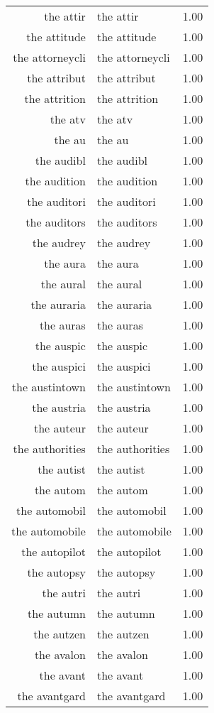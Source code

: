 \begin{table}[ht]
\begin{tabular}{rlr}
  the attir & the attir & 1.00 \\ 
  the attitude & the attitude & 1.00 \\ 
  the attorneycli & the attorneycli & 1.00 \\ 
  the attribut & the attribut & 1.00 \\ 
  the attrition & the attrition & 1.00 \\ 
  the atv & the atv & 1.00 \\ 
  the au & the au & 1.00 \\ 
  the audibl & the audibl & 1.00 \\ 
  the audition & the audition & 1.00 \\ 
  the auditori & the auditori & 1.00 \\ 
  the auditors & the auditors & 1.00 \\ 
  the audrey & the audrey & 1.00 \\ 
  the aura & the aura & 1.00 \\ 
  the aural & the aural & 1.00 \\ 
  the auraria & the auraria & 1.00 \\ 
  the auras & the auras & 1.00 \\ 
  the auspic & the auspic & 1.00 \\ 
  the auspici & the auspici & 1.00 \\ 
  the austintown & the austintown & 1.00 \\ 
  the austria & the austria & 1.00 \\ 
  the auteur & the auteur & 1.00 \\ 
  the authorities & the authorities & 1.00 \\ 
  the autist & the autist & 1.00 \\ 
  the autom & the autom & 1.00 \\ 
  the automobil & the automobil & 1.00 \\ 
  the automobile & the automobile & 1.00 \\ 
  the autopilot & the autopilot & 1.00 \\ 
  the autopsy & the autopsy & 1.00 \\ 
  the autri & the autri & 1.00 \\ 
  the autumn & the autumn & 1.00 \\ 
  the autzen & the autzen & 1.00 \\ 
  the avalon & the avalon & 1.00 \\ 
  the avant & the avant & 1.00 \\ 
  the avantgard & the avantgard & 1.00 \\ 

\end{tabular}
\end{table}
